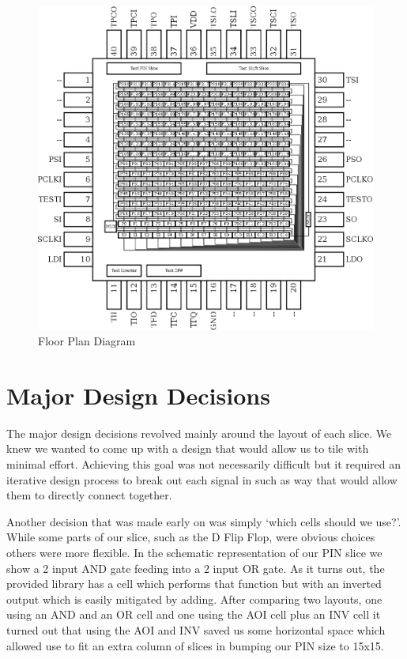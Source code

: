     \begin{figure}[H]
        \centering
        \includegraphics[width=\linewidth]{../floorplan/floorplan.png}
        \caption{Floor Plan Diagram}
        \label{fig:floorplan}
    \end{figure}

\section{Major Design Decisions}

The major design decisions revolved mainly around the layout of each slice. We
knew we wanted to come up with a design that would allow us to tile with
minimal effort.  Achieving this goal was not necessarily difficult but it
required an iterative design process to break out each signal in such as way
that would allow them to directly connect together.

Another decision that was made early on was simply `which cells should we use?'.
While some parts of our slice, such as the D Flip Flop, were obvious choices
others were more flexible. In the schematic representation of our PIN slice we
show a 2 input AND gate feeding into a 2 input OR gate. As it turns out, the
provided library has a cell which performs that function but with an inverted
output which is easily mitigated by adding. After comparing two layouts, one
using an AND and an OR cell and one using the AOI cell plus an INV cell it
turned out that using the AOI and INV saved us some horizontal space which
allowed use to fit an extra column of slices in bumping our PIN size to 15x15.

